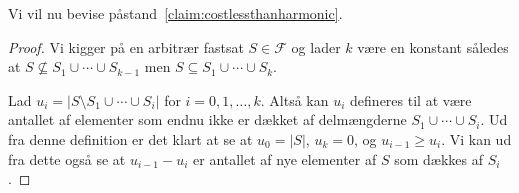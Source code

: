 Vi vil nu bevise påstand~\ref{claim:costlessthanharmonic}.

\begin{proof}
  Vi kigger på en arbitrær fastsat $S \in \mathcal{F}$ og lader $k$ være en konstant således at $S \not \subseteq S_{1} \cup \cdots \cup S_{k-1}$ men $S \subseteq S_{1} \cup \cdots \cup S_{k}$.

  Lad $u_{i} = |S \setminus S_{1} \cup \cdots \cup S_{i}|$ for $i = 0,1, \ldots, k$. Altså kan $u_{i}$ defineres til at være antallet af elementer som endnu ikke er dækket af delmængderne $S_{1} \cup \cdots \cup S_{i}$. Ud fra denne definition er det klart at se at $u_{0} = |S|$, $u_{k} = 0$, og $u_{i-1} \ge u_{i}$. Vi kan ud fra dette også se at $u_{i-1} - u_{i}$ er antallet af nye elementer af $S$ som dækkes af $S_{i}$.
\end{proof}

